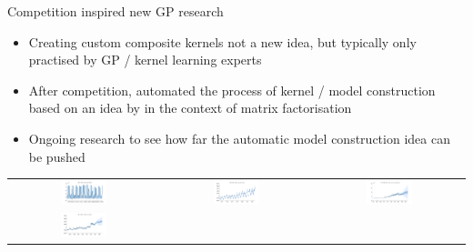 \begin{frame}{Competition inspired new GP research}
  \begin{itemize}
    \item Creating custom composite kernels not a new idea, but typically only practised by GP / kernel learning experts
    \vspace{\baselineskip}
    \item After competition, automated the process of kernel / model construction \cite{duvenaud2013structure} based on an idea by \cite{Grosse2012} in the context of matrix factorisation
    \vspace{\baselineskip}
    \item Ongoing research to see how far the automatic model construction idea can be pushed \eg
  \end{itemize}
  \begin{tabular}{ccc}
\hspace{-0.5cm}\includegraphics[width=0.33\textwidth]{figures/internet-traffic-data-in-bits-fr/internet-traffic-data-in-bits-fr_all} &
\includegraphics[width=0.32\textwidth]{figures/weekday-bus-ridership-iowa-city-/weekday-bus-ridership-iowa-city-_all} & 
\includegraphics[width=0.32\textwidth]{figures/monthly-production-of-gas-in-aus/monthly-production-of-gas-in-aus_all} \\
\hspace{-0.5cm}\includegraphics[width=0.33\textwidth]{figures/monthly-us-female-20-years-and-o/monthly-us-female-20-years-and-o_all} &

\end{tabular}
\end{frame}

